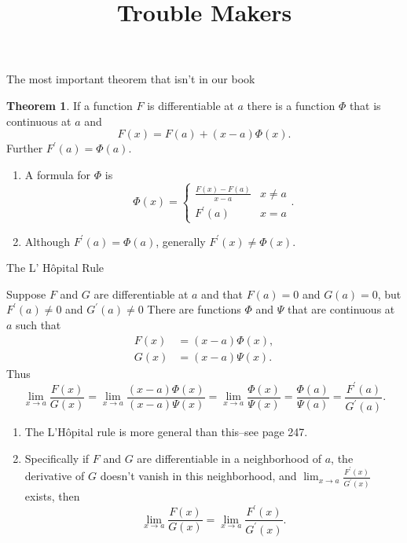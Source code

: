\documentclass[fleqn]{beamer}
\title{\textbf{Trouble Makers}}
\theoremstyle{definition}
\newtheorem{myth}{Theorem}
\begin{document}
\frame{\titlepage}

\begin{frame}{The most important theorem that isn't in our book}

\begin{myth}   If a function \(F\) is differentiable at  \(a\) there is a function \(\Phi\) that is continuous at \(a\) and
\[
   F(x) = F(a) + (x-a) \Phi(x).
\]
Further \(F^\prime(a) = \Phi(a) \).

\end{myth}

\begin{enumerate}

\item A formula for \(\Phi\) is
\[
     \Phi(x) = \begin{cases} \frac{F(x) - F(a)}{x - a}  & x \neq a \\  F^\prime(a) & x = a \end{cases}.
\]

\item Although \(F^\prime(a) = \Phi(a)\), generally   \(F^\prime(x) \neq  \Phi(x)\). 
\end{enumerate}

\end{frame}

\begin{frame}{The L' H\^opital Rule}

Suppose \(F\) and \(G\) are differentiable at \(a\) and that \(F(a) = 0\) and \(G(a) =  0\), but    \(F^\prime(a) \neq  0\) and \(G^\prime(a) \neq  0\) There are functions \(\Phi\) and \(\Psi\) that are continuous at \(a\) 
such that
\begin{align*}
  F(x) &= (x-a) \Phi(x), \\
  G(x) &= (x-a) \Psi(x).
\end{align*}
Thus
\[
   \lim_{x \to a} \frac{F(x)}{G(x)} =    \lim_{x \to a} \frac{(x-a) \Phi(x)}{(x-a) \Psi(x)} =   \lim_{x \to a} \frac{ \Phi(x)}{\Psi(x)} =  \frac{\Phi(a)}{\Psi(a)} = \frac{F^\prime(a)}{G^\prime(a)}.
\]

\begin{enumerate}

\item The L'H\^opital rule is more general than this--see page 247.

\item Specifically if \(F\) and \(G\) are differentiable in a neighborhood of \(a\), the derivative of \(G\) doesn't vanish in this neighborhood, and \(\lim_{x \to a} \frac{F^\prime(x)}{G^\prime(x)} \) exists, then
\[
  \lim_{x \to a} \frac{F(x)}{G(x)} =  \lim_{x \to a}  \frac{F^\prime(x)}{G^\prime(x)}.
\] 
\end{enumerate}
\end{frame}
\end{document}
